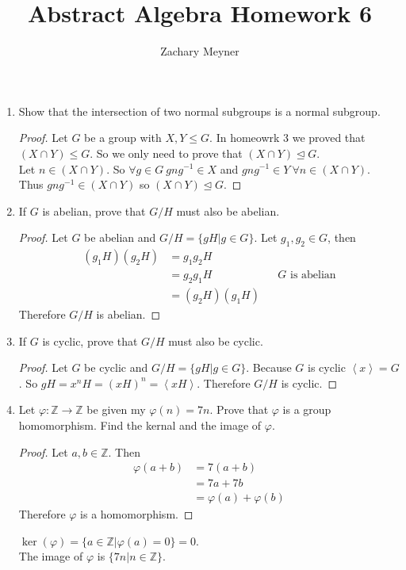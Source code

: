 \documentclass[12pt]{article}
\title{\large Abstract Algebra Homework 6}
\author{\large Zachary Meyner}
\date{}
\newcommand\setitemnumber[1]{\setcounter{enumi}{\numexpr#1-1\relax}}
\begin{document}
\maketitle
\begin{enumerate}[label=\textbf{\arabic*}.]
    \setitemnumber{5}
    \item Show that the intersection of two normal subgroups is a normal subgroup.
    \begin{proof}
        Let $G$ be a group with $X,Y \leq G$. In homeowrk 3 we proved that \\
        $(X \cap Y) \leq G$. So we only need to prove that $(X \cap Y) \trianglelefteq G$. \\
        Let $n \in (X \cap Y)$. So $\forall g \in G \ gng^{-1} \in X$ and $gng^{-1} \in Y \ \forall n \in (X \cap Y)$. \\
        Thus $gng^{-1} \in (X \cap Y)$ so $(X \cap Y) \trianglelefteq G$.
    \end{proof}
    \setitemnumber{6}
    \item If $G$ is abelian, prove that $G/H$ must also be abelian.
    \begin{proof}
        Let $G$ be abelian and $G/H = \{gH | g \in G\}$. Let $g_1,g_2 \in G$, then
        \begin{align*}
            (g_1H)(g_2H) &= g_1g_2H \\
            &= g_2g_1H && \text{$G$ is abelian} \\
            &= (g_2H)(g_1H)
        \end{align*}
        Therefore $G/H$ is abelian.
    \end{proof}
    \setitemnumber{8}
    \item If $G$ is cyclic, prove that $G/H$ must also be cyclic.
    \begin{proof}
        Let $G$ be cyclic and $G/H = \{gH | g \in G\}$. Because $G$ is cyclic $\left\langle x\right\rangle  = G$. So 
        $gH = x^nH = {(xH)}^n = \left\langle xH \right\rangle$. Therefore $G/H$ is cyclic. 
    \end{proof}
    \setitemnumber{4}
    \item Let $\varphi: \mathbb{Z} \to \mathbb{Z}$ be given my $\varphi(n) = 7n$. Prove that $\varphi$ is a group homomorphism. Find 
    the kernal and the image of $\varphi$.
    \begin{proof}
        Let $a,b \in \mathbb{Z}$. Then 
        \begin{align*}
            \varphi(a+b) &= 7(a+b) \\
            &= 7a+7b \\
            &= \varphi(a) + \varphi(b)
        \end{align*}
        Therefore $\varphi$ is a homomorphism.
    \end{proof}
    $\ker(\varphi) = \{a \in \mathbb{Z} | \varphi(a) = 0\} = {0}$. \\
    The image of $\varphi$ is $\{7n | n \in \mathbb{Z}\}$.
\end{enumerate}
\end{document}

